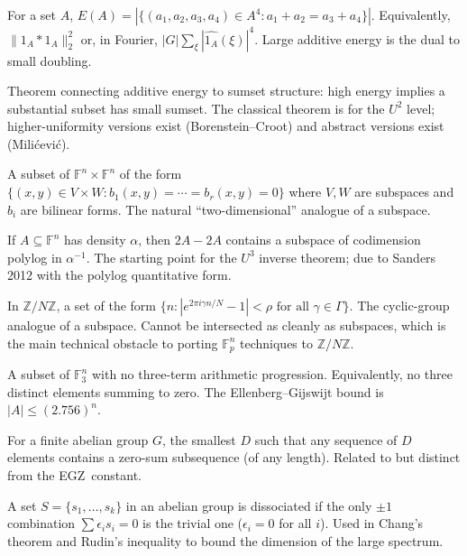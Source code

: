\documentclass[11pt,a4paper]{article}
\theoremstyle{plain}
\theoremstyle{definition}
\theoremstyle{remark}
\newcommand{\F}{\mathbb{F}}
\newcommand{\Z}{\mathbb{Z}}
\newcommand{\EGZ}{\textsf{EGZ}}
\begin{document}
\begin{description}[leftmargin=0pt]
\item[\textbf{Additive energy}] For a set $A$, $E(A) = |\{(a_1, a_2, a_3, a_4) \in A^4 : a_1 + a_2 = a_3 + a_4\}|$. Equivalently, $\|1_A * 1_A\|_2^2$ or, in Fourier, $|G| \sum_\xi |\widehat{1_A}(\xi)|^4$. Large additive energy is the dual to small doubling.

\item[\textbf{Balog--Szemer\'edi--Gowers (BSG)}] Theorem connecting additive energy to sumset structure: high energy implies a substantial subset has small sumset. The classical theorem is for the $U^2$ level; higher-uniformity versions exist (Borenstein--Croot) and abstract versions exist (Milićević).

\item[\textbf{Bilinear variety}] A subset of $\F^n \times \F^n$ of the form $\{(x, y) \in V \times W : b_1(x, y) = \cdots = b_r(x, y) = 0\}$ where $V, W$ are subspaces and $b_i$ are bilinear forms. The natural ``two-dimensional'' analogue of a subspace.

\item[\textbf{Bogolyubov--Ruzsa lemma}] If $A \subseteq \F^n$ has density $\alpha$, then $2A - 2A$ contains a subspace of codimension polylog in $\alpha^{-1}$. The starting point for the $U^3$ inverse theorem; due to Sanders 2012 with the polylog quantitative form.

\item[\textbf{Bohr set}] In $\Z/N\Z$, a set of the form $\{n : |e^{2\pi i \gamma n/N} - 1| < \rho \text{ for all } \gamma \in \Gamma\}$. The cyclic-group analogue of a subspace. Cannot be intersected as cleanly as subspaces, which is the main technical obstacle to porting $\F_p^n$ techniques to $\Z/N\Z$.

\item[\textbf{Cap set}] A subset of $\F_3^n$ with no three-term arithmetic progression. Equivalently, no three distinct elements summing to zero. The Ellenberg--Gijswijt bound is $|A| \leq (2.756)^n$.

\item[\textbf{Davenport constant}] For a finite abelian group $G$, the smallest $D$ such that any sequence of $D$ elements contains a zero-sum subsequence (of any length). Related to but distinct from the \EGZ\ constant.

\item[\textbf{Dissociated set}] A set $S = \{s_1, \ldots, s_k\}$ in an abelian group is dissociated if the only $\pm 1$ combination $\sum \epsilon_i s_i = 0$ is the trivial one ($\epsilon_i = 0$ for all $i$). Used in Chang's theorem and Rudin's inequality to bound the dimension of the large spectrum.


\end{description}
\end{document}
